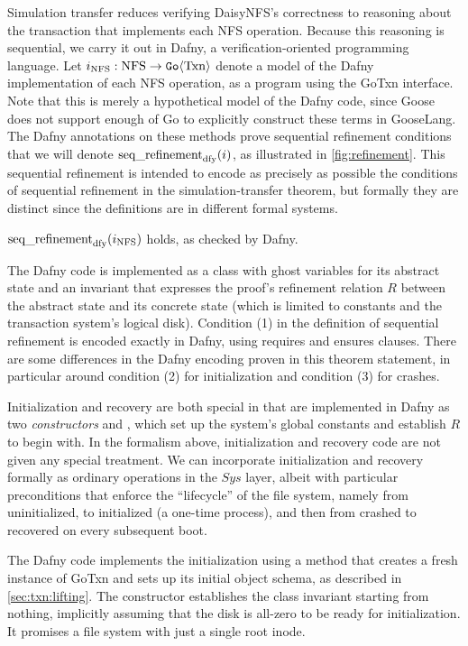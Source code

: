 \newlength{\stepw}
\newlength{\dstepw}
\newlength{\nfstop}

Simulation transfer reduces verifying DaisyNFS's correctness to reasoning about
the transaction that implements each NFS operation. Because this reasoning is
sequential, we carry it out in Dafny, a verification-oriented programming language.
Let $i_{\mathrm{NFS}} : \mathrm{NFS} \to \mathtt{Go}\langle \mathrm{Txn} \rangle$ denote a model of the
Dafny implementation of each NFS operation, as a program using the GoTxn
interface. Note that this is merely a hypothetical model of the Dafny code,
since Goose does not support enough of Go to explicitly construct these terms in
GooseLang. The Dafny annotations on these methods prove sequential refinement
conditions that we will denote $\operatorname{seq\_refinement}_{\mathrm{dfy}}(i)$, as
illustrated in \cref{fig:refinement}. This sequential refinement is intended to
encode as precisely as possible the conditions of sequential refinement in the
simulation-transfer theorem, but formally they are distinct since the
definitions are in different formal systems.

\begin{theorem} $\operatorname{seq\_refinement}_{\mathrm{dfy}}(i_{\mathrm{NFS}})$ holds, as checked by Dafny.
  \label{thm:dafny}
\end{theorem}

The Dafny code is implemented as a class with ghost variables for its abstract
state and an invariant that expresses the proof's refinement relation $R$
between the abstract state and its concrete state (which is limited to constants
and the transaction system's logical disk). Condition (1) in the definition of
sequential refinement is encoded exactly in Dafny, using requires and ensures
clauses. There are some differences in the Dafny encoding proven in this theorem statement,
in particular around condition (2) for initialization and condition (3) for
crashes.

Initialization and recovery are both special in that are implemented in Dafny as
two \emph{constructors}  and , which set up the system's
global constants and establish $R$ to begin with. In the formalism above,
initialization and recovery code are not given any special treatment. We can
incorporate initialization and recovery formally as ordinary operations in the
$\mathit{Sys}$ layer, albeit with particular preconditions that enforce the
``lifecycle'' of the file system, namely from uninitialized, to initialized (a
one-time process), and then from crashed to recovered on every subsequent boot.

The Dafny code implements the initialization using a  method
that creates a fresh instance of GoTxn and sets up its initial object schema, as
described in \cref{sec:txn:lifting}. The  constructor establishes the
class invariant  starting from nothing, implicitly assuming that the
disk is all-zero to be ready for initialization. It promises a file
system with just a single root inode.

